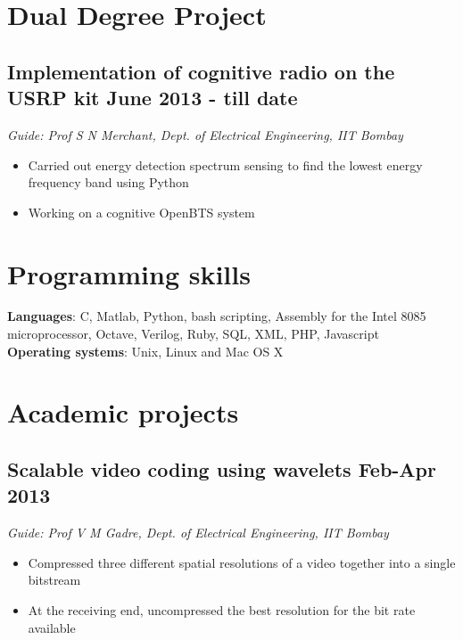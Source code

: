 \documentclass[11pt]{article}
\begin{document}
\setlength{\parindent}{0pt}


\vspace*{5\baselineskip}

\section*{Dual Degree Project}

\subsection*{Implementation of cognitive radio on the USRP kit \hfill  June 2013 - till date}
\emph{Guide: Prof S N Merchant, Dept. of Electrical Engineering, IIT Bombay} 
\begin{itemize}
\item Carried out energy detection spectrum sensing to find the lowest energy frequency band  using Python
\item Working on a cognitive OpenBTS system 
\end{itemize}


\section*{Programming skills}


\textbf{Languages}: C, Matlab, Python, bash scripting, Assembly for the Intel 8085 microprocessor, Octave, Verilog, Ruby, SQL, XML, PHP, Javascript \\
\textbf{Operating systems}: Unix, Linux and Mac OS X


\section*{Academic projects}

\subsection*{Scalable video coding using wavelets \hfill  Feb-Apr 2013}
\emph{Guide: Prof V M Gadre, Dept. of Electrical Engineering, IIT Bombay} 
\begin{itemize} 
\item Compressed three different spatial resolutions of a video together into a single bitstream  
\item At the receiving end, uncompressed the best resolution for the bit rate available 
\end{itemize}
\end{document}
